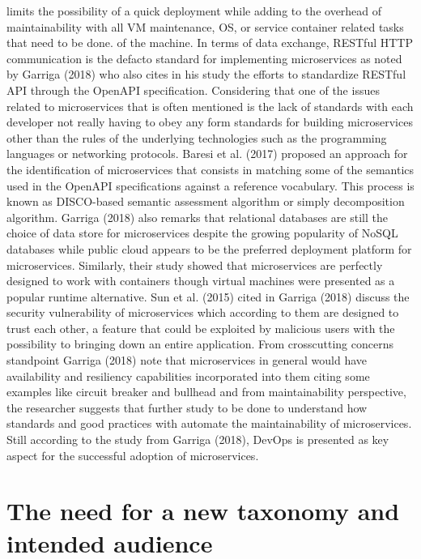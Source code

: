 \documentclass{article}
\begin{document}
limits the possibility of a quick deployment while adding to the overhead of maintainability with all VM maintenance, OS, or service container related tasks that need to be done. of the machine.  In terms of data exchange, RESTful HTTP communication is the defacto standard for implementing microservices as noted by Garriga (2018) who also cites in his study the efforts to standardize RESTful API through the OpenAPI specification. Considering that one of the issues related to microservices that is often mentioned is the lack of standards with each developer not really having to obey any form standards for building microservices other than the rules of the underlying technologies such as the programming languages or networking protocols. Baresi et al. (2017) proposed an approach for the identification of microservices that consists in matching some of the semantics used in the OpenAPI specifications against a reference vocabulary. This process is known as DISCO-based semantic assessment algorithm or simply decomposition algorithm. Garriga (2018) also remarks that relational databases are still the choice of data store for microservices despite the growing popularity of NoSQL databases while public cloud appears to be the preferred deployment platform for microservices. Similarly, their study showed that microservices are perfectly designed to work with containers though virtual machines were presented as a popular runtime alternative. Sun et al. (2015) cited in Garriga (2018) discuss the security vulnerability of microservices which according to them are designed to trust each other, a feature that could be exploited by malicious users with the possibility to bringing down an entire application. From crosscutting concerns standpoint Garriga (2018) note that microservices in general would have availability and resiliency capabilities incorporated into them citing some examples like circuit breaker and bullhead and from maintainability perspective, the researcher suggests that further study to be done to understand how standards and good practices with automate the maintainability of microservices. Still according to the study from Garriga (2018), DevOps is presented as key aspect for the successful adoption of microservices.

\section{The need for a new taxonomy and intended audience}
\end{document}

